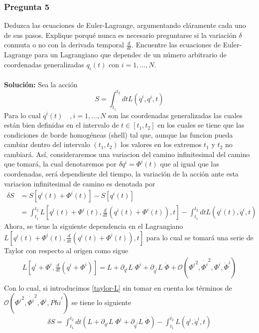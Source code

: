 \documentclass[../main_ej.tex]{subfiles}
\begin{document}
\subsubsection{Pregunta 5}
Deduzca las ecuaciones de Euler-Lagrange, argumentando cláramente cada uno de sus pasos. Explique porqué nunca es necesario preguntarse si la variación $\delta$ conmuta o no con la derivada temporal $\frac{d}{dt}$. Encuentre las ecuaciones de Euler-Lagrange para un Lagrangiano que dependec de un número arbitrario de coordenadas generalizadas $q_i(t)$ con $i=1,\dots ,N$. \\
\\
\textbf{Solución:}
Sea la acción
\begin{equation}
  S= \int_{t_1}^{t_2}dt L(\dot{q}^i,q^i,t) 
\end{equation}
Para lo cual $q^i(t)\quad , i=1,\dots , N$ son las coordenadas generalizadas las cuales están bien definidas en el intervalo de $t\in[t_1,t_2]$ en los cuales se tiene que las condiciones de borde homogéneas (shell) tal que, aunque las funcion pueda cambiar dentro del intervalo $(t_1,t_2)$ los valores en los extremos $t_1$ y $t_2$ no cambiará. Así, consideraremos una variacion del camino infinitesimal del camino que tomará, la cual denotaremos por $\delta q^i=\Phi^i(t)$ que al igual que las coordenadas, será dependiente del tiempo, la variación de la acción ante esta variacion infinitesimal de camino es denotada por
\begin{align*}
  \delta S & =S[q^i(t)+\Phi^i(t)]-S[q^i(t)] \\
           & = \int_{t_1}^{t_2} L\left[ q^i(t) + \Phi^i(t) , \frac{d}{dt}\left( q^i(t)+\Phi^i(t)\right ),t \right] - \int_{t_1}^{t_2}dtL (q^i(t), \dot{q}^i,t) 
\end{align*}
Ahora, se tiene la siguiente dependencia en el Lagrangiano  $L\left[ q^i(t) + \Phi^i(t) , \frac{d}{dt}\left( q^i(t)+\Phi^i(t)\right),t \right]$ para lo cual se tomará una serie de Taylor con respecto al origen como sigue
\begin{align} 
  L\left[q^i+\Phi^i, \frac{d}{dt}\left(q^i+ \Phi^i  \right) \right]= L + \partial_{q^i} L \; \Phi^i + \partial_{\dot{q}^i}L \;  \dot{\Phi} + \mathcal{O}({\Phi^i}^2,\dot{\Phi^i}^2 , \Phi^i, \dot{\Phi}^i) \label{taylor-L} \\
\end{align}
Con lo cual, si introducimos \eqref{taylor-L} sin tomar en cuenta los términos de $ \mathcal{O}({\Phi^i}^2,\dot{\Phi^i}^2 , \Phi^i, \dot{Phi}^i)$ se tiene lo siguiente
\begin{align*}
  \delta S  = \int_{t_1}^{t_2} dt \left(  L + \partial_{q^i} L \; \Phi^i + \partial_{\dot{q}^i}L \;  \dot{\Phi} \right) - \int_{t_1}^{t_2} L(q^i,\dot{q}^i,t)  
\end{align*}
\end{document}
